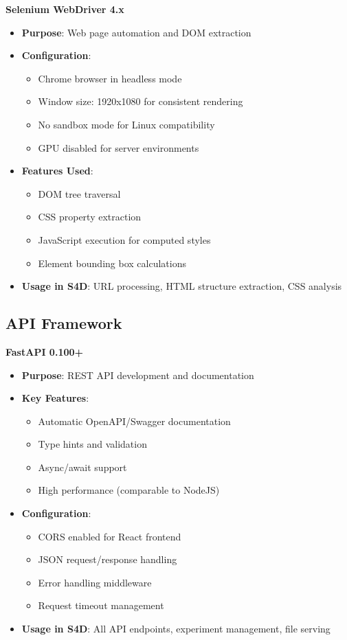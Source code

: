 \textbf{Selenium WebDriver 4.x}
\begin{itemize}
    \item \textbf{Purpose}: Web page automation and DOM extraction
    \item \textbf{Configuration}: 
        \begin{itemize}
            \item Chrome browser in headless mode
            \item Window size: 1920x1080 for consistent rendering
            \item No sandbox mode for Linux compatibility
            \item GPU disabled for server environments
        \end{itemize}
    \item \textbf{Features Used}:
        \begin{itemize}
            \item DOM tree traversal
            \item CSS property extraction
            \item JavaScript execution for computed styles
            \item Element bounding box calculations
        \end{itemize}
    \item \textbf{Usage in S4D}: URL processing, HTML structure extraction, CSS analysis
\end{itemize}

\subsection{API Framework}
\label{subsec:api-framework}

\textbf{FastAPI 0.100+}
\begin{itemize}
    \item \textbf{Purpose}: REST API development and documentation
    \item \textbf{Key Features}:
        \begin{itemize}
            \item Automatic OpenAPI/Swagger documentation
            \item Type hints and validation
            \item Async/await support
            \item High performance (comparable to NodeJS)
        \end{itemize}
    \item \textbf{Configuration}:
        \begin{itemize}
            \item CORS enabled for React frontend
            \item JSON request/response handling
            \item Error handling middleware
            \item Request timeout management
        \end{itemize}
    \item \textbf{Usage in S4D}: All API endpoints, experiment management, file serving
\end{itemize}

